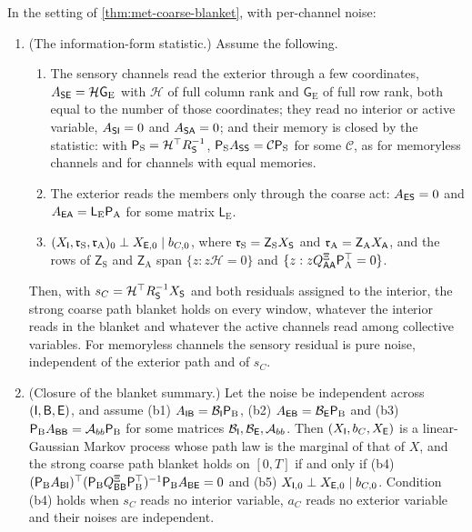 \begin{proposition}\label{prop:met-sufficiency}
In the setting of \cref{thm:met-coarse-blanket}, with per-channel noise:
\begin{enumerate}
\item[(a)] (The information-form statistic.) Assume the following.
\begin{enumerate}
\item[(a1)] The sensory channels read the exterior through a few coordinates, $A_{\mathsf{S}\mathsf{E}}=\mathcal H\mathsf G_{\mathrm E}$ with $\mathcal H$ of full column rank and $\mathsf G_{\mathrm E}$ of full row rank, both equal to the number of those coordinates; they read no interior or active variable, $A_{\mathsf{S}\mathsf{I}}=0$ and $A_{\mathsf{S}\mathsf{A}}=0$; and their memory is closed by the statistic: with $\mathsf P_{\mathrm S}=\mathcal H^\top R_{\mathsf{S}}^{-1}$, $\mathsf P_{\mathrm S}A_{\mathsf{S}\mathsf{S}}=\mathcal C\mathsf P_{\mathrm S}$ for some $\mathcal C$, as for memoryless channels and for channels with equal memories.
\item[(a2)] The exterior reads the members only through the coarse act: $A_{\mathsf{E}\mathsf{S}}=0$ and $A_{\mathsf{E}\mathsf{A}}=\mathsf L_{\mathrm E}\mathsf P_{\mathrm A}$ for some matrix $\mathsf L_{\mathrm E}$.
\item[(a3)] $(X_{\mathsf{I}},\mathfrak r_{\mathrm S},\mathfrak r_{\mathrm A})_0\perp X_{\mathsf{E},0}\mid b_{C,0}$, where $\mathfrak r_{\mathrm S}=\mathsf Z_{\mathrm S}X_{\mathsf{S}}$ and $\mathfrak r_{\mathrm A}=\mathsf Z_{\mathrm A}X_{\mathsf{A}}$, and the rows of $\mathsf Z_{\mathrm S}$ and $\mathsf Z_{\mathrm A}$ span $\{z:z\mathcal H=0\}$ and $\{z:zQ^{\Xi}_{\mathsf{A}\mathsf{A}}\mathsf P_{\mathrm A}^\top=0\}$.
\end{enumerate}
Then, with $s_C=\mathcal H^\top R_{\mathsf{S}}^{-1}X_{\mathsf{S}}$ and both residuals assigned to the interior, the strong coarse path blanket holds on every window, whatever the interior reads in the blanket and whatever the active channels read among collective variables. For memoryless channels the sensory residual is pure noise, independent of the exterior path and of $s_C$.
\item[(b)] (Closure of the blanket summary.) Let the noise be independent across $(\mathsf{I},\mathsf{B},\mathsf{E})$, and assume (b1) $A_{\mathsf{I}\mathsf{B}}=\mathcal B_{\mathsf{I}}\mathsf P_{\mathrm B}$, (b2) $A_{\mathsf{E}\mathsf{B}}=\mathcal B_{\mathsf{E}}\mathsf P_{\mathrm B}$ and (b3) $\mathsf P_{\mathrm B}A_{\mathsf{B}\mathsf{B}}=\mathcal A_{bb}\mathsf P_{\mathrm B}$ for some matrices $\mathcal B_{\mathsf{I}},\mathcal B_{\mathsf{E}},\mathcal A_{bb}$. Then $(X_{\mathsf{I}},b_C,X_{\mathsf{E}})$ is a linear-Gaussian Markov process whose path law is the marginal of that of $X$, and the strong coarse path blanket holds on $[0,T]$ if and only if (b4) $(\mathsf P_{\mathrm B}A_{\mathsf{B}\mathsf{I}})^\top(\mathsf P_{\mathrm B}Q^{\Xi}_{\mathsf{B}\mathsf{B}}\mathsf P_{\mathrm B}^\top)^{-1}\mathsf P_{\mathrm B}A_{\mathsf{B}\mathsf{E}}=0$ and (b5) $X_{\mathsf{I},0}\perp X_{\mathsf{E},0}\mid b_{C,0}$. Condition (b4) holds when $s_C$ reads no interior variable, $a_C$ reads no exterior variable and their noises are independent.

\end{enumerate}
\end{proposition}

